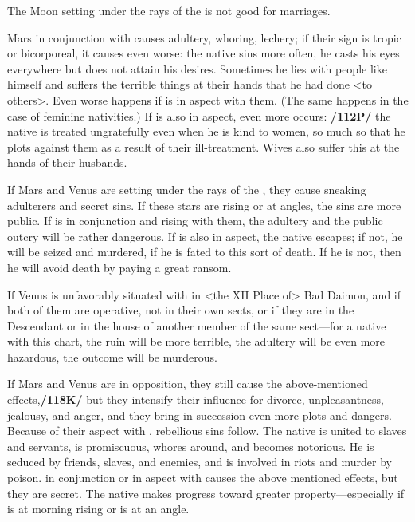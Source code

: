 The Moon setting under the rays of the \Sun\xspace is not good for marriages. 

Mars in conjunction with \Mercury\xspace causes adultery, whoring, lechery; if their sign is tropic or bicorporeal, it causes even worse: the native sins more often, he casts his eyes everywhere but does not attain his desires. Sometimes he lies with people like himself and suffers the terrible things at their hands that he had done <to others>. Even
worse happens if \Mercury\xspace is in aspect with them. (The same happens in the case of feminine nativities.) If \Saturn\xspace is also in aspect, even more occurs: \textbf{/112P/} the native is treated ungratefully even when he is kind to women, so much so that he plots against them as a result of their ill-treatment. Wives also suffer this at the hands of their husbands.

If Mars and Venus are setting under the rays of the \Sun, they cause sneaking adulterers and secret sins.
If these stars are rising or at angles, the sins are more public. If \Mercury\xspace is in conjunction and rising with
them, the adultery and the public outcry will be rather dangerous. If \Jupiter\xspace is also in aspect, the native
escapes; if not, he will be seized and murdered, if he is fated to this sort of death. If he is not, then he will
avoid death by paying a great ransom. 

If Venus is unfavorably situated with \Mars\xspace in <the XII Place of> Bad Daimon, and if both of them are operative, not in their own sects, or if they are in the Descendant or in the house of another member of the same sect—for a native with this chart, the ruin will be more terrible,
the adultery will be even more hazardous, the outcome will be murderous. 

If Mars and Venus are in opposition, they still cause the above-mentioned effects,\textbf{/118K/} but they intensify their influence for
divorce, unpleasantness, jealousy, and anger, and they bring in succession even more plots and dangers. Because of their aspect with \Mercury, rebellious sins follow. The native is united to slaves and servants, is promiscuous, whores around, and becomes notorious. He is seduced by friends, slaves, and enemies, and is involved in riots and murder by poison.
\Jupiter\xspace in conjunction or in aspect with \Venus\xspace causes the above mentioned effects, but they are secret. The native makes progress toward greater property—especially if \Jupiter\xspace is at morning rising or is at an angle.

